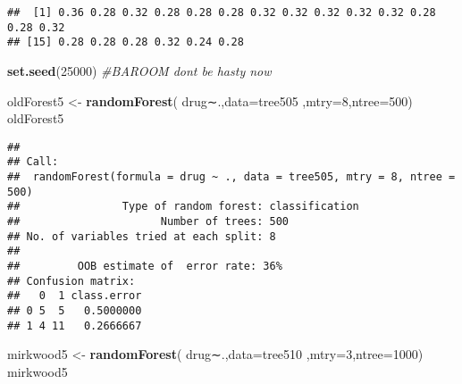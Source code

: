 \documentclass[]{article}
\newenvironment{Shaded}{\begin{snugshade}}{\end{snugshade}}
\newcommand{\KeywordTok}[1]{\textcolor[rgb]{0.13,0.29,0.53}{\textbf{#1}}}
\newcommand{\DataTypeTok}[1]{\textcolor[rgb]{0.13,0.29,0.53}{#1}}
\newcommand{\DecValTok}[1]{\textcolor[rgb]{0.00,0.00,0.81}{#1}}
\newcommand{\StringTok}[1]{\textcolor[rgb]{0.31,0.60,0.02}{#1}}
\newcommand{\CommentTok}[1]{\textcolor[rgb]{0.56,0.35,0.01}{\textit{#1}}}
\newcommand{\ControlFlowTok}[1]{\textcolor[rgb]{0.13,0.29,0.53}{\textbf{#1}}}
\newcommand{\OperatorTok}[1]{\textcolor[rgb]{0.81,0.36,0.00}{\textbf{#1}}}
\newcommand{\NormalTok}[1]{#1}
\begin{document}
\begin{Shaded}
\end{Shaded}

\begin{verbatim}
##  [1] 0.36 0.28 0.32 0.28 0.28 0.28 0.32 0.32 0.32 0.32 0.32 0.28 0.28 0.32
## [15] 0.28 0.28 0.28 0.32 0.24 0.28
\end{verbatim}

\begin{Shaded}
\begin{Highlighting}[]
\KeywordTok{set.seed}\NormalTok{(}\DecValTok{25000}\NormalTok{)}
\CommentTok{#BAROOM dont be hasty now}

\NormalTok{oldForest5 <-}\StringTok{ }\KeywordTok{randomForest}\NormalTok{( drug∼.,}\DataTypeTok{data=}\NormalTok{tree505  ,}\DataTypeTok{mtry=}\DecValTok{8}\NormalTok{,}\DataTypeTok{ntree=}\DecValTok{500}\NormalTok{)}
\NormalTok{oldForest5}
\end{Highlighting}
\end{Shaded}

\begin{verbatim}
## 
## Call:
##  randomForest(formula = drug ~ ., data = tree505, mtry = 8, ntree = 500) 
##                Type of random forest: classification
##                      Number of trees: 500
## No. of variables tried at each split: 8
## 
##         OOB estimate of  error rate: 36%
## Confusion matrix:
##   0  1 class.error
## 0 5  5   0.5000000
## 1 4 11   0.2666667
\end{verbatim}

\begin{Shaded}
\begin{Highlighting}[]
\NormalTok{mirkwood5 <-}\StringTok{ }\KeywordTok{randomForest}\NormalTok{( drug∼.,}\DataTypeTok{data=}\NormalTok{tree510  ,}\DataTypeTok{mtry=}\DecValTok{3}\NormalTok{,}\DataTypeTok{ntree=}\DecValTok{1000}\NormalTok{)}
\NormalTok{mirkwood5}
\end{Highlighting}
\end{Shaded}
\end{document}
